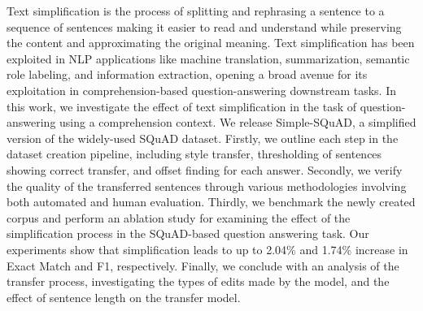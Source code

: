 Text simplification is the process of splitting and rephrasing a sentence to a sequence of sentences making it easier to read and understand while preserving the content and approximating the original meaning. Text simplification has been exploited in NLP applications like machine translation, summarization, semantic role labeling, and information extraction, opening a broad avenue for its exploitation in comprehension-based question-answering downstream tasks. In this work, we investigate the effect of text simplification in the task of question-answering using a comprehension context. We release Simple-SQuAD, a simplified version of the widely-used SQuAD dataset. Firstly, we outline each step in the dataset creation pipeline, including style transfer, thresholding of sentences showing correct transfer, and offset finding for each answer. Secondly, we verify the quality of the transferred sentences through various methodologies involving both automated and human evaluation. Thirdly, we benchmark the newly created corpus and perform an ablation study for examining the effect of the simplification process in the SQuAD-based question answering task. Our experiments show that simplification leads to up to 2.04\% and 1.74\% increase in Exact Match and F1, respectively. Finally, we conclude with an analysis of the transfer process, investigating the types of edits made by the model, and the effect of sentence length on the transfer model.
